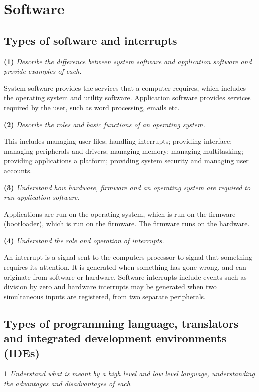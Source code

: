 \section{Software}
\subsection{Types of software and interrupts}

\textbf{(1)}\textit{ Describe the difference between system software
and application software and provide examples
of each.}

System software provides the services that a computer requires, which includes the operating
system and utility software. Application software provides services required by the user, such
as word processing, emails etc.

\bigskip
\noindent\textbf{(2)} \textit{Describe the roles and basic functions of an operating system.}

This includes managing user files; handling interrupts; providing interface; managing peripherals
and drivers; managing memory; managing multitasking; providing applications a platform; providing
system security and managing user accounts.

\bigskip
\noindent\textbf{(3)} 
\textit{Understand how hardware, firmware and an operating system are required to
run application software.}

Applications are run on the operating system, which is run on the firmware (bootloader), which is
run on the firmware. The firmware runs on the hardware.

\bigskip
\noindent\textbf{(4)}
\textit{Understand the role and operation of interrupts.}

An interrupt is a signal sent to the computers processor to signal that something requires its
attention. It is generated when something has gone wrong, and can originate from software or 
hardware. Software interrupts include events such as division by zero and hardware interrupts may
be generated when two simultaneous inputs are registered, from two separate peripherals.

\subsection{Types of programming language, translators and integrated development environments
(IDEs)}
\textbf{1} \textit{Understand what is meant by a high level and low level language, understanding
the advantages and disadvantages of each}

